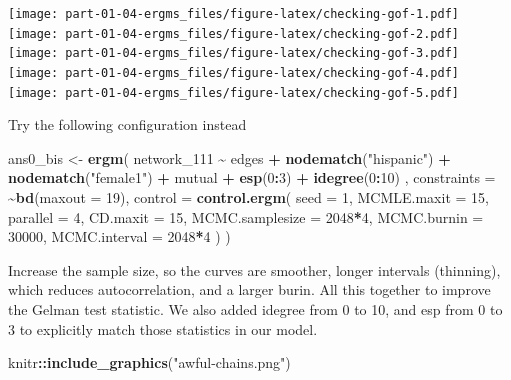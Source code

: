 \documentclass[
]{book}
\newenvironment{Shaded}{\begin{snugshade}}{\end{snugshade}}
\newcommand{\AttributeTok}[1]{\textcolor[rgb]{0.13,0.29,0.53}{#1}}
\newcommand{\DecValTok}[1]{\textcolor[rgb]{0.00,0.00,0.81}{#1}}
\newcommand{\FunctionTok}[1]{\textcolor[rgb]{0.13,0.29,0.53}{\textbf{#1}}}
\newcommand{\NormalTok}[1]{#1}
\newcommand{\OtherTok}[1]{\textcolor[rgb]{0.56,0.35,0.01}{#1}}
\newcommand{\SpecialCharTok}[1]{\textcolor[rgb]{0.81,0.36,0.00}{\textbf{#1}}}
\newcommand{\StringTok}[1]{\textcolor[rgb]{0.31,0.60,0.02}{#1}}
\begin{document}
\texttt{[image: part-01-04-ergms\_files/figure-latex/checking-gof-1.pdf]} \texttt{[image: part-01-04-ergms\_files/figure-latex/checking-gof-2.pdf]} \texttt{[image: part-01-04-ergms\_files/figure-latex/checking-gof-3.pdf]} \texttt{[image: part-01-04-ergms\_files/figure-latex/checking-gof-4.pdf]} \texttt{[image: part-01-04-ergms\_files/figure-latex/checking-gof-5.pdf]}

Try the following configuration instead

\begin{Shaded}
\begin{Highlighting}[]
\NormalTok{ans0\_bis }\OtherTok{\textless{}{-}} \FunctionTok{ergm}\NormalTok{(}
\NormalTok{  network\_111 }\SpecialCharTok{\textasciitilde{}}
\NormalTok{    edges }\SpecialCharTok{+}
    \FunctionTok{nodematch}\NormalTok{(}\StringTok{"hispanic"}\NormalTok{) }\SpecialCharTok{+}
    \FunctionTok{nodematch}\NormalTok{(}\StringTok{"female1"}\NormalTok{) }\SpecialCharTok{+}
\NormalTok{    mutual }\SpecialCharTok{+} 
    \FunctionTok{esp}\NormalTok{(}\DecValTok{0}\SpecialCharTok{:}\DecValTok{3}\NormalTok{) }\SpecialCharTok{+} 
    \FunctionTok{idegree}\NormalTok{(}\DecValTok{0}\SpecialCharTok{:}\DecValTok{10}\NormalTok{)}
\NormalTok{    ,}
  \AttributeTok{constraints =} \SpecialCharTok{\textasciitilde{}}\FunctionTok{bd}\NormalTok{(}\AttributeTok{maxout =} \DecValTok{19}\NormalTok{),}
  \AttributeTok{control =} \FunctionTok{control.ergm}\NormalTok{(}
    \AttributeTok{seed        =} \DecValTok{1}\NormalTok{,}
    \AttributeTok{MCMLE.maxit =} \DecValTok{15}\NormalTok{,}
    \AttributeTok{parallel    =} \DecValTok{4}\NormalTok{,}
    \AttributeTok{CD.maxit    =} \DecValTok{15}\NormalTok{,}
    \AttributeTok{MCMC.samplesize =} \DecValTok{2048}\SpecialCharTok{*}\DecValTok{4}\NormalTok{,}
    \AttributeTok{MCMC.burnin =} \DecValTok{30000}\NormalTok{,}
    \AttributeTok{MCMC.interval =} \DecValTok{2048}\SpecialCharTok{*}\DecValTok{4}
\NormalTok{    )}
\NormalTok{  )}
\end{Highlighting}
\end{Shaded}

Increase the sample size, so the curves are smoother, longer intervals (thinning), which reduces autocorrelation, and a larger burin. All this together to improve the Gelman test statistic. We also added idegree from 0 to 10, and esp from 0 to 3 to explicitly match those statistics in our model.

\begin{Shaded}
\begin{Highlighting}[]
\NormalTok{knitr}\SpecialCharTok{::}\FunctionTok{include\_graphics}\NormalTok{(}\StringTok{"awful{-}chains.png"}\NormalTok{)}
\end{Highlighting}
\end{Shaded}
\end{document}
